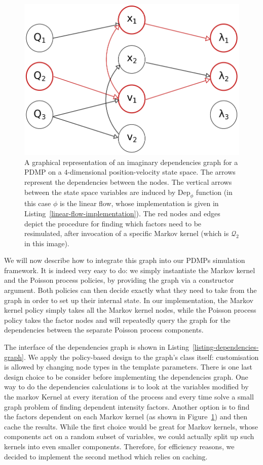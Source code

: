 \documentclass[report.tex]{subfiles}
\begin{document}
\begin{figure}
  \centering
  \includegraphics[width=.5\textwidth]{img/ch3-dependencies-graph}
  \caption{A graphical representation of an imaginary dependencies graph for
           a PDMP on a $4$-dimensional position-velocity state space.
           The arrows represent the dependencies between the nodes.
           The vertical arrows between the state space variables are
           induced by $\text{Dep}_{\phi}$ function (in this case
           $\phi$ is the linear flow, whose implementation is given in
           Listing~\ref{linear-flow-implementation}).
           The red nodes and edges depict the procedure
           for finding which factors need to be resimulated, after invocation
           of a specific Markov kernel (which is $\mathcal{Q}_{2}$ in this image).}
  \label{image-dependencies-graph}
\end{figure}


We will now describe how to integrate this graph into our PDMPs simulation framework.
It is indeed very easy to do: we simply instantiate the Markov kernel and the Poisson process
policies, by providing the graph via a constructor argument.
Both policies can then decide exactly what they need to take from the graph in order
to set up their internal state. In our implementation, the Markov kernel policy simply
takes all the Markov kernel nodes, while the Poisson process policy takes the
factor nodes and will repeatedly query the graph for the dependencies between
the separate Poisson process components.

The interface of the dependencies graph is shown in Listing~\ref{listing-dependencies-graph}.
We apply the policy-based design to the graph's class itself:
customisation is allowed by changing node types in the template parameters.
There is one last design choice to be consider before implementing the dependencies graph.
One way to do the dependencies calculations is to look at the variables
modified by the markov Kernel at every iteration of the process and every time
solve a small graph problem of finding dependent intensity factors.
Another option is to find the factors dependent on each Markov kernel (as shown
in Figure~\ref{image-dependencies-graph}) and then cache the results.
While the first choice would be great for Markov kernels, whose components
act on a random subset of variables, we could actually split up such kernels
into even smaller components.
Therefore, for efficiency reasons, we decided to implement the second method
which relies on caching.
\end{document}
